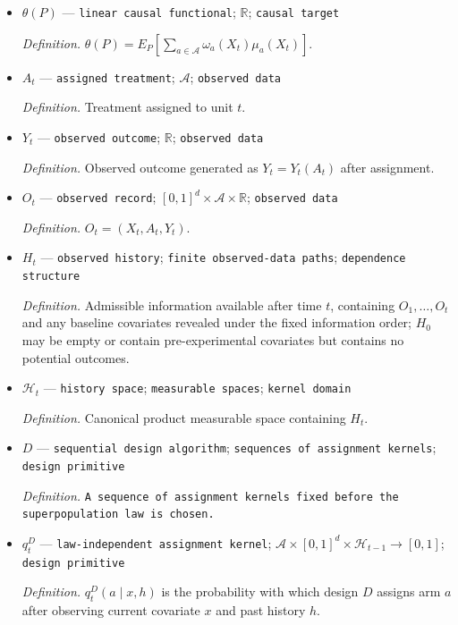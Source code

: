 \documentclass{article}
\begin{document}
\begin{itemize}
  \par\smallskip\noindent\emph{Definition.} \(m_a(x)=\omega_a(x)^2\sigma_a^2(x)\).
  \item \(\theta(P)\) --- \texttt{linear causal functional}; \(\mathbb R\); \texttt{causal target}
  \par\smallskip\noindent\emph{Definition.} \(\theta(P)=E_P[\sum_{a\in\mathcal A}\omega_a(X_t)\mu_a(X_t)]\).
  \item \(A_t\) --- \texttt{assigned treatment}; \(\mathcal A\); \texttt{observed data}
  \par\smallskip\noindent\emph{Definition.} Treatment assigned to unit \(t\).
  \item \(Y_t\) --- \texttt{observed outcome}; \(\mathbb R\); \texttt{observed data}
  \par\smallskip\noindent\emph{Definition.} Observed outcome generated as \(Y_t=Y_t(A_t)\) after assignment.
  \item \(O_t\) --- \texttt{observed record}; \([0,1]^d\times\mathcal A\times\mathbb R\); \texttt{observed data}
  \par\smallskip\noindent\emph{Definition.} \(O_t=(X_t,A_t,Y_t)\).
  \item \(H_t\) --- \texttt{observed history}; \texttt{finite observed-\allowbreak{}data paths}; \texttt{dependence structure}
  \par\smallskip\noindent\emph{Definition.} Admissible information available after time \(t\), containing \(O_1,\ldots,O_t\) and any baseline covariates revealed under the fixed information order; \(H_0\) may be empty or contain pre-experimental covariates but contains no potential outcomes.
  \item \(\mathcal H_t\) --- \texttt{history space}; \texttt{measurable spaces}; \texttt{kernel domain}
  \par\smallskip\noindent\emph{Definition.} Canonical product measurable space containing \(H_t\).
  \item \(D\) --- \texttt{sequential design algorithm}; \texttt{sequences of assignment kernels}; \texttt{design primitive}
  \par\smallskip\noindent\emph{Definition.} \texttt{A sequence of assignment kernels fixed before the superpopulation law is chosen.}
  \item \(q_t^D\) --- \texttt{law-\allowbreak{}independent assignment kernel}; \(\mathcal A\times[0,1]^d\times\mathcal H_{t-1}\to[0,1]\); \texttt{design primitive}
  \par\smallskip\noindent\emph{Definition.} \(q_t^D(a\mid x,h)\) is the probability with which design \(D\) assigns arm \(a\) after observing current covariate \(x\) and past history \(h\).

\end{itemize}
\end{document}
